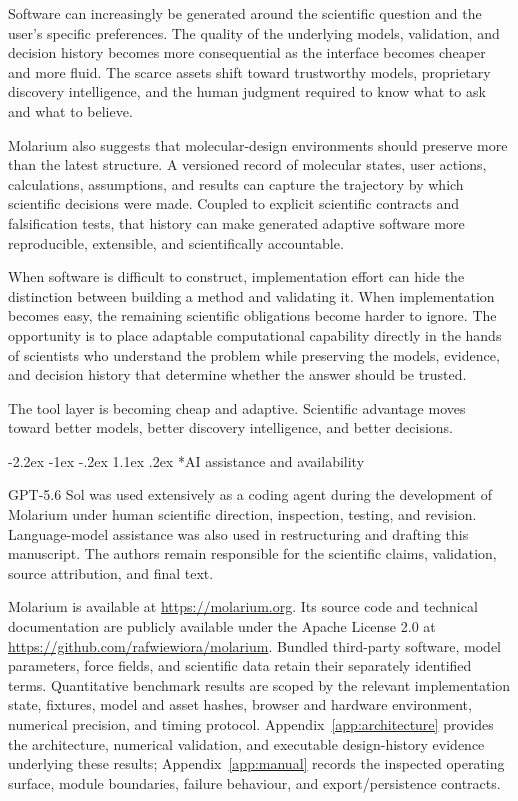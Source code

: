 \documentclass[11pt]{article}
\makeatletter
\renewcommand\section{\@startsection{section}{1}{\z@}%
  {-2.2ex \@plus -1ex \@minus -.2ex}%
  {1.1ex \@plus .2ex}%
  {\normalfont\Large\bfseries\color{molblue}}}
\makeatother
\begin{document}
Software can increasingly be generated around the scientific question and the user's specific preferences. The quality of the underlying models, validation, and decision history becomes more consequential as the interface becomes cheaper and more fluid. The scarce assets shift toward trustworthy models, proprietary discovery intelligence, and the human judgment required to know what to ask and what to believe.

Molarium also suggests that molecular-design environments should preserve more than the latest structure. A versioned record of molecular states, user actions, calculations, assumptions, and results can capture the trajectory by which scientific decisions were made. Coupled to explicit scientific contracts and falsification tests, that history can make generated adaptive software more reproducible, extensible, and scientifically accountable.

When software is difficult to construct, implementation effort can hide the distinction between building a method and validating it. When implementation becomes easy, the remaining scientific obligations become harder to ignore. The opportunity is to place adaptable computational capability directly in the hands of scientists who understand the problem while preserving the models, evidence, and decision history that determine whether the answer should be trusted.

The tool layer is becoming cheap and adaptive. Scientific advantage moves toward better models, better discovery intelligence, and better decisions.

\section*{AI assistance and availability}

GPT-5.6 Sol was used extensively as a coding agent during the development of Molarium under human scientific direction, inspection, testing, and revision. Language-model assistance was also used in restructuring and drafting this manuscript. The authors remain responsible for the scientific claims, validation, source attribution, and final text.

Molarium is available at \url{https://molarium.org}. Its source code and technical documentation are publicly available under the Apache License 2.0 at \url{https://github.com/rafwiewiora/molarium}. Bundled third-party software, model parameters, force fields, and scientific data retain their separately identified terms. Quantitative benchmark results are scoped by the relevant implementation state, fixtures, model and asset hashes, browser and hardware environment, numerical precision, and timing protocol. Appendix~\ref{app:architecture} provides the architecture, numerical validation, and executable design-history evidence underlying these results; Appendix~\ref{app:manual} records the inspected operating surface, module boundaries, failure behaviour, and export/persistence contracts.
\end{document}
